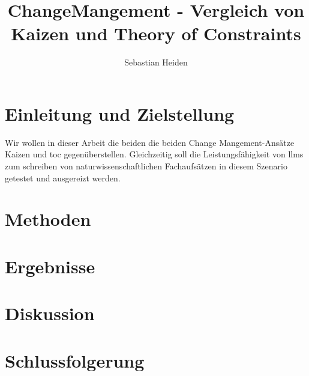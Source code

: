 \documentclass[acmlarge,authorversion,nonacm]{acmart}
\begin{document}
	\title{ChangeMangement - Vergleich von Kaizen und Theory of Constraints}
	
	\author{Sebastian Heiden}

\begin{abstract}

\end{abstract}




\maketitle

\section{Einleitung und Zielstellung}

Wir wollen in dieser Arbeit die beiden die beiden Change Mangement-Ansätze Kaizen und \gls{toc} gegenüberstellen.
Gleichzeitig soll die Leistungsfähigkeit von \glspl{llm} zum schreiben von naturwissenschaftlichen Fachaufsätzen in diesem Szenario getestet und ausgereizt werden.
\section{Methoden}\label{sec:methods}


\section{Ergebnisse}\label{sec:results}


\section{Diskussion}\label{sec:discussion}


\section{Schlussfolgerung}\label{sec:conclusion}
\end{document}
